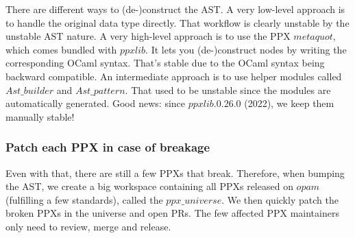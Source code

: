 \documentclass[10pt, a4paper, twocolumn]{article}
\begin{document}
There are different ways to (de-)construct the AST. A very low-level approach is
to handle the original data type directly. That workflow is clearly unstable by
the unstable AST nature. A very high-level approach is to use the PPX
$metaquot$, which comes bundled with $ppxlib$. It lets you (de-)construct nodes
by writing the corresponding OCaml syntax. That's stable due to the OCaml syntax
being backward compatible. An intermediate approach is to use helper modules
called $Ast\_builder$ and $Ast\_pattern$. That used to be unstable since the
modules are automatically generated. Good news: since $ppxlib.0.26.0 $ (2022),
we keep them manually stable!

%
%

\subsubsection*{Patch each PPX in case of breakage}

Even with that, there are still a few PPXs that break. Therefore, when bumping
the AST, we create a big workspace containing all PPXs released on $opam$
(fulfilling a few standards), called the $ppx\_universe$\cite{universe}. We then
quickly patch the broken PPXs in the universe and open PRs. The few affected PPX
maintainers only need to review, merge and release.


\nocite{*}


\end{document}
